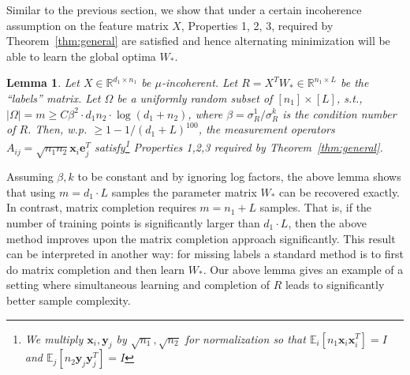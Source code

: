 \documentclass[11pt]{article}
\newtheorem{lemma}{Lemma}
\newcommand{\e}{\bm{e}}
\newcommand{\tp}[1]{{#1}^{T}}
\newcommand{\E}{\mathbb{E}}
\newcommand{\Vot}{\tp{V}_*}
\newcommand{\So}{\Sigma_*}
\newcommand{\Uo}{U_*}
\newcommand{\ytj}{\tp{\y}_j}
\newcommand{\Wo}{W_*}
\newcommand{\x}{\bm{x}}
\newcommand{\y}{\bm{y}}
\newcommand{\yj}{\y_j}
\begin{document}
Similar to the previous section, we show that under a certain  incoherence assumption on the feature matrix $X$, Properties 1, 2, 3, required by Theorem~\ref{thm:general} are satisfied and hence alternating minimization will be able to learn the global optima $\Wo$. 
\begin{lemma}\label{lemma:mult}
Let  $X\in \mathbb{R}^{d_1\times n_1}$ be $\mu$-incoherent. Let $R=\tp{X}\Wo \in \mathbb{R}^{n_1\times L}$ be the ``labels'' matrix. %
Let $\Omega$ be a uniformly random subset of $[n_1]\times [L]$, s.t., $|\Omega|=m\geq C  \beta^2\cdot d_1 n_2\cdot \log(d_1+n_2)$, where $\beta=\sigma_R^1/\sigma_R^k$ is the condition number of $R$. Then, w.p. $\geq 1-1/(d_1+L)^{100}$, the measurement operators $A_{ij}=\sqrt{n_1n_2}\x_i \tp{\e}_j$ satisfy\footnote{We multiply $\x_i, \y_j$ by $\sqrt{n_1}, \sqrt{n_2}$ for normalization so that $\E_{i}[n_1\x_i\x_i^T]=I$ and $\E_{j}[n_2\yj\ytj]=I$} Properties 1,2,3 required by Theorem~\ref{thm:general}. %
\end{lemma}
Assuming $\beta, k$ to be constant and by ignoring log factors, the above lemma shows that using $m=d_1 \cdot L$ samples the parameter matrix $\Wo$ can be recovered exactly. In contrast, matrix completion requires  $m=n_1+L$ samples. That is, if the number of training points is significantly larger than $d_1\cdot L$, then the above method improves upon the matrix completion approach significantly. This result can be interpreted in another way: for  missing labels a standard method is to first do matrix completion and then learn $\Wo$. Our above lemma gives an example of a setting where  simultaneous learning and  completion of  $R$ leads to significantly better sample complexity. 
\end{document}
